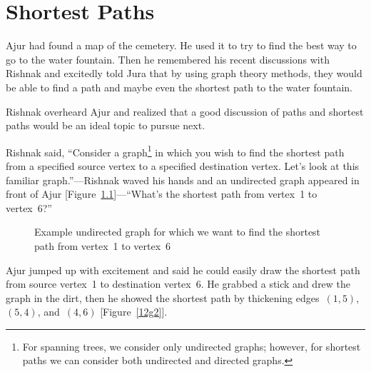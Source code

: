 \chapter{Shortest Paths}
Ajur had found a map of the cemetery. He used it to try to find the best way to go to the water fountain. Then he remembered his recent discussions with Rishnak and excitedly told Jura that by using graph theory methods, they would be able to find a path and maybe even the shortest path to the water fountain.

Rishnak overheard Ajur and realized that a good discussion of paths and shortest paths would be an ideal topic to pursue next.

Rishnak said, ``Consider a graph\footnote{For spanning trees, we consider only undirected graphs; however, for shortest paths we can consider both undirected and directed graphs.} in which you wish to find the shortest path from a specified source vertex to a specified destination vertex. Let's look at this familiar graph.''---Rishnak waved his hands and an undirected graph appeared in front of Ajur [Figure~\ref{12g1}]---``What's the shortest path from vertex~1 to vertex~6?'' 

\begin{figure}
\begin{center}
\caption{Example undirected graph for which we want to find the shortest path from vertex~1 to vertex~6}\label{12g1}
\end{center}
\end{figure}

Ajur jumped up with excitement and said he could easily draw the shortest path from source vertex~1 to destination vertex~6. He grabbed a stick and drew the graph in the dirt, then he showed the shortest path by thickening edges~$(1,5)$, $(5,4)$, and~$(4,6)$ [Figure~\ref{12g2}].

